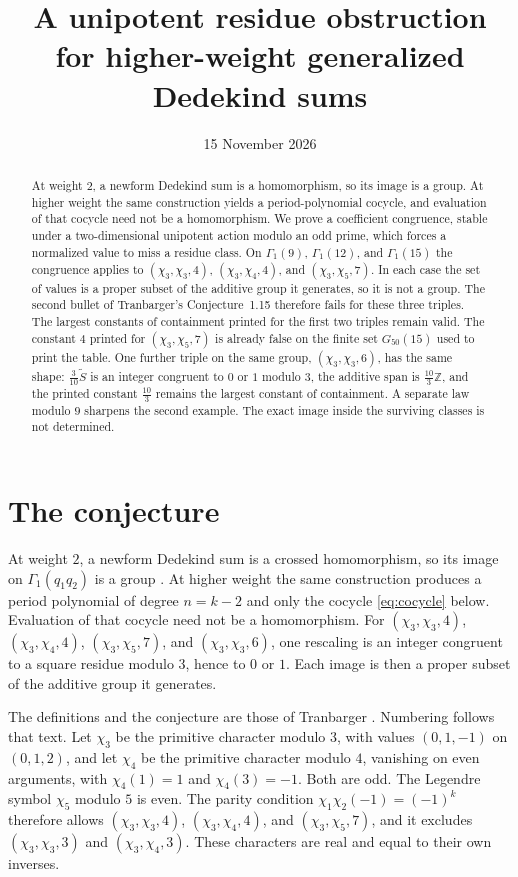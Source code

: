 \documentclass[11pt]{article}
\title{A unipotent residue obstruction\\ for higher-weight generalized Dedekind sums}
\author{}
\date{15 November 2026}
\theoremstyle{remark}
\newcommand{\tS}{\widetilde{S}}
\newcommand{\Z}{\mathbb{Z}}
\begin{document}
\maketitle

\begin{abstract}
At weight \(2\), a newform Dedekind sum is a homomorphism, so its image is a group.
At higher weight the same construction yields a period-polynomial cocycle, and evaluation of that cocycle need not be a homomorphism.
We prove a coefficient congruence, stable under a two-dimensional unipotent action modulo an odd prime, which forces a normalized value to miss a residue class.
On \(\Gamma_1(9)\), \(\Gamma_1(12)\), and \(\Gamma_1(15)\) the congruence applies to \((\chi_3,\chi_3,4)\), \((\chi_3,\chi_4,4)\), and \((\chi_3,\chi_5,7)\).
In each case the set of values is a proper subset of the additive group it generates, so it is not a group.
The second bullet of Tranbarger's Conjecture~1.15 therefore fails for these three triples.
The largest constants of containment printed for the first two triples remain valid.
The constant \(4\) printed for \((\chi_3,\chi_5,7)\) is already false on the finite set \(G_{50}(15)\) used to print the table.
One further triple on the same group, \((\chi_3,\chi_3,6)\), has the same shape: \(\tfrac{3}{10}\tS\) is an integer congruent to \(0\) or \(1\) modulo \(3\), the additive span is \(\tfrac{10}{3}\Z\), and the printed constant \(\tfrac{10}{3}\) remains the largest constant of containment.
A separate law modulo \(9\) sharpens the second example.
The exact image inside the surviving classes is not determined.
\end{abstract}

\section{The conjecture}
\label{sec:conj}

At weight \(2\), a newform Dedekind sum is a crossed homomorphism, so its image on \(\Gamma_1(q_1q_2)\) is a group \cite{Majure,SVY}.
At higher weight the same construction produces a period polynomial of degree \(n=k-2\) and only the cocycle \eqref{eq:cocycle} below.
Evaluation of that cocycle need not be a homomorphism.
For \((\chi_3,\chi_3,4)\), \((\chi_3,\chi_4,4)\), \((\chi_3,\chi_5,7)\), and \((\chi_3,\chi_3,6)\), one rescaling is an integer congruent to a square residue modulo \(3\), hence to \(0\) or \(1\).
Each image is then a proper subset of the additive group it generates.

The definitions and the conjecture are those of Tranbarger \cite{Tran}.
Numbering follows that text.
Let \(\chi_3\) be the primitive character modulo \(3\), with values \((0,1,-1)\) on \((0,1,2)\), and let \(\chi_4\) be the primitive character modulo \(4\), vanishing on even arguments, with \(\chi_4(1)=1\) and \(\chi_4(3)=-1\).
Both are odd.
The Legendre symbol \(\chi_5\) modulo \(5\) is even.
The parity condition \(\chi_1\chi_2(-1)=(-1)^k\) therefore allows \((\chi_3,\chi_3,4)\), \((\chi_3,\chi_4,4)\), and \((\chi_3,\chi_5,7)\), and it excludes \((\chi_3,\chi_3,3)\) and \((\chi_3,\chi_4,3)\).
These characters are real and equal to their own inverses.
\end{document}
